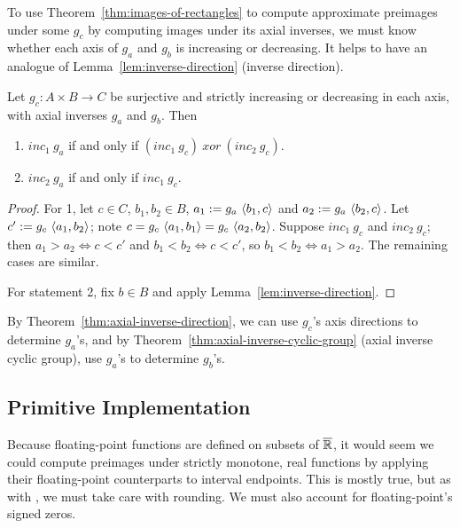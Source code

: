 To use Theorem~\ref{thm:images-of-rectangles} to compute approximate preimages under some $g_c$ by computing images under its axial inverses, we must know whether each axis of $g_a$ and $g_b$ is increasing or decreasing.
It helps to have an analogue of Lemma~\ref{lem:inverse-direction} (inverse direction).

\begin{theorem}
\label{thm:axial-inverse-direction}
Let $g_c : A \times B \to C$ be surjective and strictly increasing or decreasing in each axis, with axial inverses $g_a$ and $g_b$.
Then
\begin{enumerate}
	\item $inc_1~g_a$ if and only if $(inc_1~g_c)~xor~(inc_2~g_c)$.
	\item $inc_2~g_a$ if and only if $inc_1~g_c$.
\end{enumerate}
\end{theorem}
\begin{proof}
For 1, let $c \in C$, $b_1,b_2 \in B$, $a_1 := g_a~\langle{b_1,c}\rangle$ and $a_2 := g_a~\langle{b_2,c}\rangle$.
Let $c' := g_c~\langle{a_1,b_2}\rangle$; note $c = g_c~\langle{a_1,b_1}\rangle = g_c~\langle{a_2,b_2}\rangle$.
Suppose $inc_1~g_c$ and $inc_2~g_c$; then $a_1 > a_2 \iff c < c'$ and $b_1 < b_2 \iff c < c'$, so $b_1 < b_2 \iff a_1 > a_2$.
The remaining cases are similar.

For statement 2, fix $b \in B$ and apply Lemma~\ref{lem:inverse-direction}.
\end{proof}

By Theorem~\ref{thm:axial-inverse-direction}, we can use $g_c$'s axis directions to determine $g_a$'s, and by Theorem~\ref{thm:axial-inverse-cyclic-group} (axial inverse cyclic group), use $g_a$'s to determine $g_b$'s.



\subsection{Primitive Implementation}
\label{sec:primitive-implementation}

Because floating-point functions are defined on subsets of $\cl{\Re}$, it would seem we could compute preimages under strictly monotone, real functions by applying their floating-point counterparts to interval endpoints.
This is mostly true, but as with , we must take care with rounding.
We must also account for floating-point's signed zeros.

